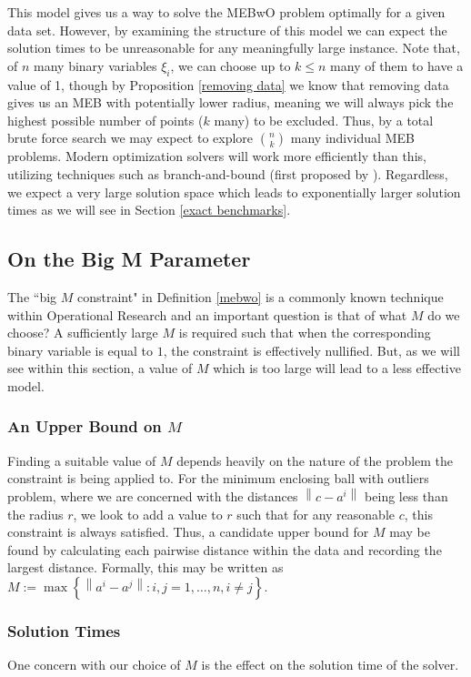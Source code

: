 \documentclass[11pt,twoside]{report}
\newcommand{\norm}[1]{\left\lVert#1\right\rVert}
\theoremstyle{definition}
\numberwithin{theorem}{section}
\numberwithin{definition}{section}
\numberwithin{lemma}{section}
\numberwithin{proposition}{section}
\numberwithin{equation}{section}
\numberwithin{figure}{section}
\begin{document}
This model gives us a way to solve the MEBwO problem optimally for a given data set. However, by examining the structure of this model we can expect the solution times to be unreasonable for any meaningfully large instance. Note that, of $n$ many binary variables $\xi_i$, we can choose up to $k\leq n$ many of them to have a value of 1, though by Proposition \ref{removing data} we know that removing data gives us an MEB with potentially lower radius, meaning we will always pick the highest possible number of points ($k$ many) to be excluded. Thus, by a total brute force search we may expect to explore $\binom{n}{k}$ many individual MEB problems. Modern optimization solvers will work more efficiently than this, utilizing techniques such as branch-and-bound (first proposed by \cite{bnb}). Regardless, we expect a very large solution space which leads to exponentially larger solution times as we will see in Section \ref{exact benchmarks}.


\subsection{On the Big M Parameter}
The ``big $M$ constraint" in Definition \ref{mebwo} is a commonly known technique within Operational Research and an important question is that of what $M$ do we choose? A sufficiently large $M$ is required such that when the corresponding binary variable is equal to $1$, the constraint is effectively nullified. But, as we will see within this section, a value of $M$ which is too large will lead to a less effective model.

\subsubsection{An Upper Bound on $M$}
Finding a suitable value of $M$ depends heavily on the nature of the problem the constraint is being applied to. For the minimum enclosing ball with outliers problem, where we are concerned with the distances $\norm{c-a^i}$ being less than the radius $r$, we look to add a value to $r$ such that for any reasonable $c$, this constraint is always satisfied. Thus, a candidate upper bound for $M$ may be found by calculating each pairwise distance within the data and recording the largest distance. Formally, this may be written as $M:= \max\left\{\norm{a^i-a^j}: i,j = 1,\ldots,n, i\neq j\right\}$.
\subsubsection{Solution Times}
One concern with our choice of $M$ is the effect on the solution time of the solver.
\end{document}
